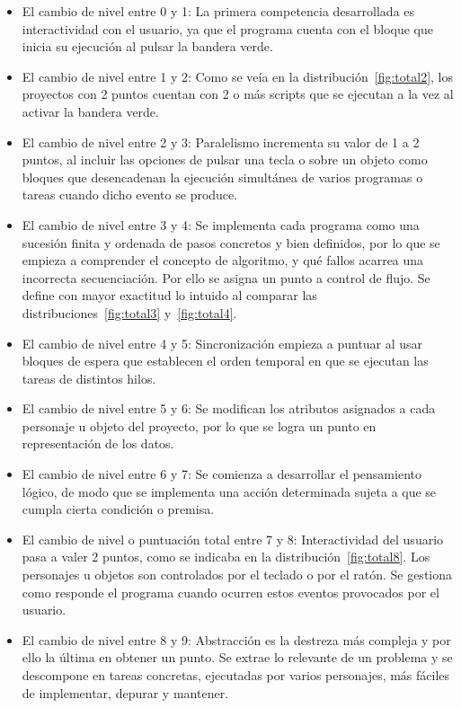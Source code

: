 \documentclass[a4paper, 12pt]{book}
\begin{document}
\begin{itemize}
 \item El cambio de nivel entre 0 y 1: La primera competencia desarrollada es interactividad con el usuario, ya que el programa cuenta con el bloque que inicia su ejecución al pulsar la bandera verde.
 \item El cambio de nivel entre 1 y 2: Como se veía en la distribución~\ref{fig:total2}, los proyectos con 2 puntos cuentan con 2 o más scripts que se ejecutan a la vez al activar la bandera verde.
 \item El cambio de nivel entre 2 y 3: Paralelismo incrementa su valor de 1 a 2 puntos, al incluir las opciones de pulsar una tecla o sobre un objeto como bloques que desencadenan la ejecución simultánea de varios programas o tareas cuando dicho evento se produce.
 \item El cambio de nivel entre 3 y 4: Se implementa cada programa como una sucesión finita y ordenada de pasos concretos y bien definidos, por lo que se empieza a comprender el concepto de algoritmo, y qué fallos acarrea una incorrecta secuenciación. Por ello se asigna un punto a control de flujo. Se define con mayor exactitud lo intuido al comparar las distribuciones~\ref{fig:total3} y~\ref{fig:total4}. 
 \item El cambio de nivel entre 4 y 5: Sincronización empieza a puntuar al usar bloques de espera que establecen el orden temporal en que se ejecutan las tareas de distintos hilos. 
 \item El cambio de nivel entre 5 y 6: Se modifican los atributos asignados a cada personaje u objeto del proyecto, por lo que se logra un punto en representación de los datos.
 \item El cambio de nivel entre 6 y 7: Se comienza a desarrollar el pensamiento lógico, de modo que se implementa una acción determinada sujeta a que se cumpla cierta condición o premisa.
 \item El cambio de nivel o puntuación total entre 7 y 8: Interactividad del usuario pasa a valer 2 puntos, como se indicaba en la distribución~\ref{fig:total8}. Los personajes u objetos son controlados por el teclado o por el ratón. Se gestiona como responde el programa cuando ocurren estos eventos provocados por el usuario.
 \item El cambio de nivel entre 8 y 9: Abstracción es la destreza más compleja y por ello la última en obtener un punto. Se extrae lo relevante de un problema y se descompone en tareas concretas, ejecutadas por varios personajes, más fáciles de implementar, depurar y mantener.

\end{itemize}
\end{document}
